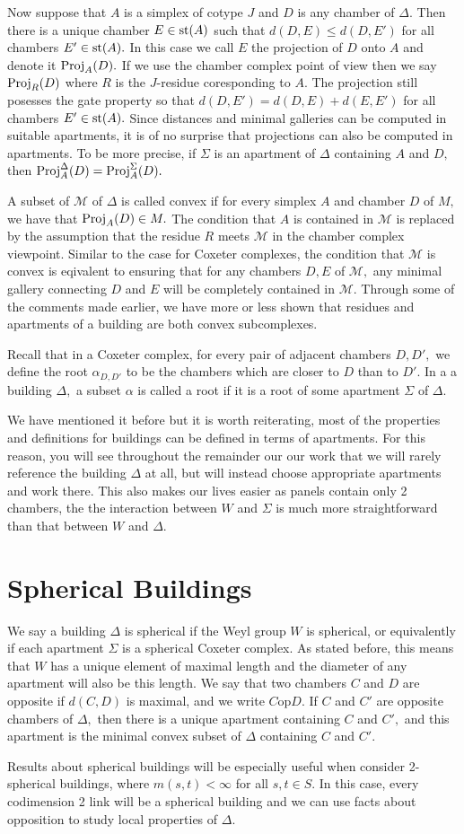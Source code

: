 \documentclass[class=book, crop=false,12 pt]{standalone}
\begin{document}
Now suppose that $A$ is a simplex of cotype $J$ and $D$ is any chamber of $\Delta.$ Then there is a unique chamber $E\in \mathrm{st}(A)$ such that $d(D,E)\le d(D,E')$ for all chambers $E'\in \mathrm{st}(A).$ In this case we call $E$ the projection of $D$ onto $A$ and denote it $\mathrm{Proj}_A(D).$ If we use the chamber complex point of view then we say $\mathrm{Proj}_R(D)$ where $R$ is the $J$-residue coresponding to $A.$ The projection still posesses the gate property so that $d(D,E')=d(D,E)+d(E,E')$ for all chambers $E'\in \mathrm{st}(A).$ Since distances and minimal galleries can be computed in suitable apartments, it is of no surprise that projections can also be computed in apartments. To be more precise, if $\Sigma$ is an apartment of $\Delta$ containing $A$ and $D,$ then $\mathrm{Proj}_A^\Delta(D)=\mathrm{Proj}_A^\Sigma(D).$ 

A subset of $\mathcal{M}$ of $\Delta$ is called convex if for every simplex $A$ and chamber $D$ of $M,$ we have that $\mathrm{Proj}_A(D)\in M.$ The condition that $A$ is contained in $\mathcal{M}$ is replaced by the assumption that the residue $R$ meets $\mathcal{M}$ in the chamber complex viewpoint. Similar to the case for Coxeter complexes, the condition that $\mathcal{M}$ is convex is eqivalent to ensuring that for any chambers $D,E$ of $\mathcal{M},$ any minimal gallery connecting $D$ and $E$ will be completely contained in $\mathcal{M}.$ Through some of the comments made earlier, we have more or less shown that residues and apartments of a building are both convex subcomplexes. 

Recall that in a Coxeter complex, for every pair of adjacent chambers $D,D',$ we define the root $\alpha_{D,D'}$ to be the chambers which are closer to $D$ than to $D'.$ In a a building $\Delta,$ a subset $\alpha$ is called a root if it is a root of some apartment $\Sigma$ of $\Delta.$

We have mentioned it before but it is worth reiterating, most of the properties and definitions for buildings can be defined in terms of apartments. For this reason, you will see throughout the remainder our our work that we will rarely reference the building $\Delta$ at all, but will instead choose appropriate apartments and work there. This also makes our lives easier as panels contain only 2 chambers, the the interaction between $W$ and $\Sigma$ is much more straightforward than that between $W$ and $\Delta.$ 

\section{Spherical Buildings}
We say a building $\Delta$ is spherical if the Weyl group $W$ is spherical, or equivalently if each apartment $\Sigma$ is a spherical Coxeter complex. As stated before, this means that $W$ has a unique element of maximal length and the diameter of any apartment will also be this length. We say that two chambers $C$ and $D$ are opposite if $d(C,D)$ is maximal, and we write $C \mathrm{ op }D.$ If $C$ and $C'$ are opposite chambers of $\Delta,$ then there is a unique apartment containing $C$ and $C',$ and this apartment is the minimal convex subset of $\Delta$ containing $C$ and $C'.$ 

Results about spherical buildings will be especially useful when consider 2-spherical buildings, where $m(s,t)<\infty$ for all $s,t\in S.$ In this case, every codimension 2 link will be a spherical building and we can use facts about opposition to study local properties of $\Delta.$
\end{document}
